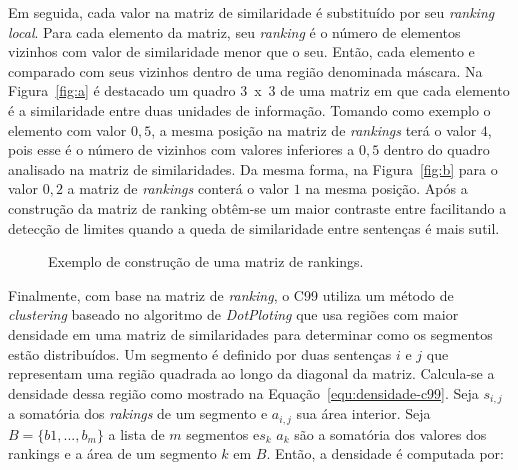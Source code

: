 
Em seguida, cada valor na matriz de similaridade é substituído por seu \textit{ranking local}. Para cada elemento da matriz, seu \textit{ranking} é o número de elementos vizinhos com valor de similaridade menor que o seu. Então, cada elemento e comparado com seus vizinhos dentro de uma região denominada máscara.
% 
% 
Na Figura~\ref{fig:a} é destacado um quadro 3~x~3 de uma matriz em que cada elemento é a similaridade entre duas unidades de informação. Tomando como exemplo o elemento com valor $0,5$, a mesma posição na matriz de \textit{rankings} terá o valor $4$, pois esse é o número de vizinhos com valores inferiores a $0,5$ dentro do quadro analisado na matriz de similaridades. Da mesma forma, na Figura~\ref{fig:b} para o valor $0,2$ a matriz de \textit{rankings} conterá o valor $1$ na mesma posição. Após a construção da matriz de ranking obtêm-se um maior contraste entre facilitando a detecção de limites quando a queda de similaridade entre sentenças é mais sutil.

\begin{figure}[!h]
	\centering     %

	
	\caption{Exemplo de construção de uma matriz de rankings.%
	}
	\label{fig:exemplomatrixrank}
\end{figure}




Finalmente, com base na matriz de \textit{ranking}, o C99 utiliza um método de \textit{clustering} baseado no algoritmo de \textit{DotPloting} que usa regiões com maior densidade em uma matriz de similaridades para determinar como os segmentos estão distribuídos. Um segmento é definido por duas sentenças $i$ e $j$ que representam uma região quadrada ao longo da diagonal da matriz. Calcula-se a densidade dessa região como mostrado na Equação~\ref{equ:densidade-c99}. Seja $s_{i,j}$ a somatória dos \textit{rakings} de um segmento e $a_{i,j}$ sua área interior. Seja $B = \{b1,...,b_m\}$ a lista de $m$ segmentos e$s_k$  $a_k$ são a somatória dos valores dos rankings e a área de um segmento $k$ em $B$. Então, a densidade é computada por: 

